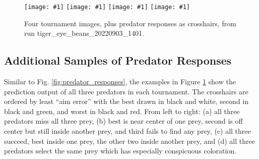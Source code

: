 \documentclass[letterpaper]{article}
\newcommand{\runID}{\footnotesize}
\newcommand{\igfour}[1]{\texttt{[image: \#1]}}
\begin{document}
\begin{figure}[t]
    \igfour{20220904_step_4883.png}
    \hfill
    \igfour{20220904_step_4788.png}
    \hfill
    \igfour{20220904_step_3914.png}
    \hfill
    \igfour{20220904_step_4636.png}
    \caption{Four tournament images, plus predator responses as crosshairs, from run {\runID tiger\_eye\_beans\_20220903\_1401}.}
    \label{fig:tiger_eye_beans_4x}
\end{figure}

\subsection{Additional Samples of Predator Responses}
\label{sec:additional_predator_responses}
Similar to Fig. \ref{fig:predator_responses}, the examples in Figure \ref{fig:tiger_eye_beans_4x} show the prediction output of all three predators in each tournament. The crosshairs are ordered by least “aim error” with the best drawn in black and white, second in black and green, and worst in black and red. From left to right: (a) all three predators miss all three prey, (b) best is near center of one prey, second is off center but still inside another prey, and third fails to find any prey, (c) all three succeed, best inside one prey, the other two inside another prey, and (d) all three predators select the same prey which has especially conspicuous coloration.
\par


\end{document}
